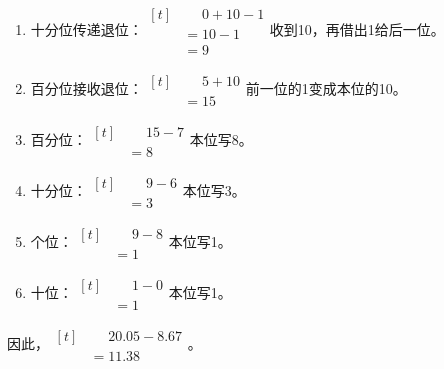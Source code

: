 {\begin{enumerate}[leftmargin=1.7em,itemsep=5pt,topsep=0pt]
\item 十分位传递退位：\(\begin{aligned}[t]&\phantom{={}}0+10-1\\&=10-1\\&=9\end{aligned}\)\quad 收到10，再借出1给后一位。
\item 百分位接收退位：\(\begin{aligned}[t]&\phantom{={}}5+10\\&=15\end{aligned}\)\quad 前一位的1变成本位的10。
\item 百分位：\(\begin{aligned}[t]&\phantom{={}}15-7\\&=8\end{aligned}\)\quad 本位写8。
\item 十分位：\(\begin{aligned}[t]&\phantom{={}}9-6\\&=3\end{aligned}\)\quad 本位写3。
\item 个位：\(\begin{aligned}[t]&\phantom{={}}9-8\\&=1\end{aligned}\)\quad 本位写1。
\item 十位：\(\begin{aligned}[t]&\phantom{={}}1-0\\&=1\end{aligned}\)\quad 本位写1。
\end{enumerate}
\par\smallskip
因此，\(\begin{aligned}[t]&\phantom{={}}20.05-8.67\\&=11.38\end{aligned}\)。
\par\medskip

}
